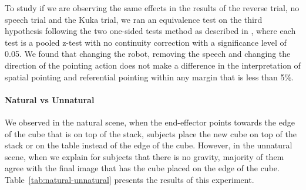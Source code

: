 To study if we are observing the same effects in the results of the reverse trial, no speech trial and the Kuka trial, we ran an equivalence test on the third hypothesis following the two one-sided tests method as described in \cite{lakens2017equivalence}, where each test is a pooled z-test with no continuity
correction with a significance level of 0.05. We found that changing the robot, removing the speech and changing the direction of the pointing action does not make a difference in the interpretation of spatial pointing and referential pointing within any margin that is less than 5\%.




\paragraph{Natural vs Unnatural}

We observed in the natural scene, when the end-effector points towards the edge of the cube that is on top of the stack, subjects place the new cube on top of the stack or on the table instead of the edge of the cube. However, in the unnatural scene, when we explain for subjects that there is no gravity, majority of them agree with the final image that has the cube placed on the edge of the cube. Table~\ref{tab:natural-unnatural} presents the results of this experiment. 









